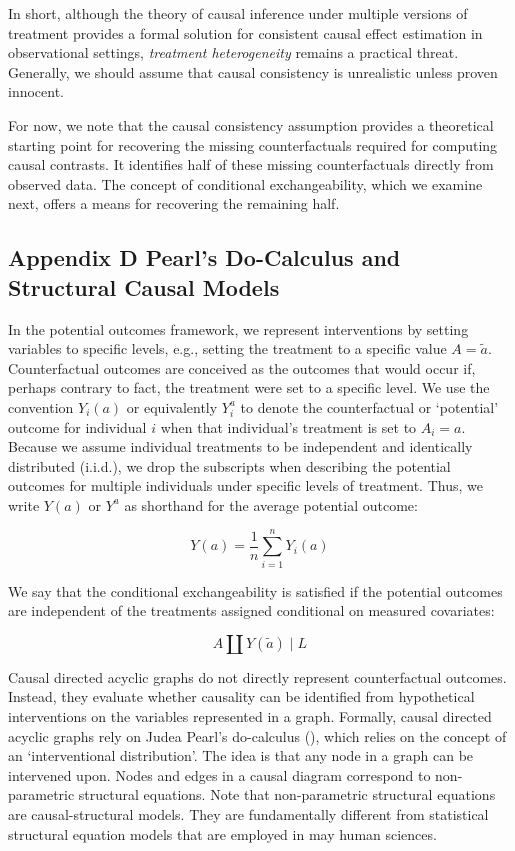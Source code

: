 \documentclass[
  single column]{article}
\begin{document}
In short, although the theory of causal inference under multiple
versions of treatment provides a formal solution for consistent causal
effect estimation in observational settings, \emph{treatment
heterogeneity} remains a practical threat. Generally, we should assume
that causal consistency is unrealistic unless proven innocent.

For now, we note that the causal consistency assumption provides a
theoretical starting point for recovering the missing counterfactuals
required for computing causal contrasts. It identifies half of these
missing counterfactuals directly from observed data. The concept of
conditional exchangeability, which we examine next, offers a means for
recovering the remaining half.

\newpage{}

\subsection{Appendix D Pearl's Do-Calculus and Structural Causal
Models}\label{id-app-d}

In the potential outcomes framework, we represent interventions by
setting variables to specific levels, e.g., setting the treatment to a
specific value \(A = \tilde{a}\). Counterfactual outcomes are conceived
as the outcomes that would occur if, perhaps contrary to fact, the
treatment were set to a specific level. We use the convention \(Y_i(a)\)
or equivalently \(Y_i^{a}\) to denote the counterfactual or `potential'
outcome for individual \(i\) when that individual's treatment is set to
\(A_i = a\). Because we assume individual treatments to be independent
and identically distributed (i.i.d.), we drop the subscripts when
describing the potential outcomes for multiple individuals under
specific levels of treatment. Thus, we write \(Y(a)\) or \(Y^a\) as
shorthand for the average potential outcome:

\[
Y(a) = \frac{1}{n} \sum_{i=1}^n Y_i(a)
\]

We say that the conditional exchangeability is satisfied if the
potential outcomes are independent of the treatments assigned
conditional on measured covariates:

\[
A \coprod Y(\tilde{a}) \mid L
\]

Causal directed acyclic graphs do not directly represent counterfactual
outcomes. Instead, they evaluate whether causality can be identified
from hypothetical interventions on the variables represented in a graph.
Formally, causal directed acyclic graphs rely on Judea Pearl's
do-calculus (), which relies on the
concept of an `interventional distribution'. The idea is that any node
in a graph can be intervened upon. Nodes and edges in a causal diagram
correspond to non-parametric structural equations. Note that
non-parametric structural equations are causal-structural models. They
are fundamentally different from statistical structural equation models
that are employed in may human sciences.
\end{document}
